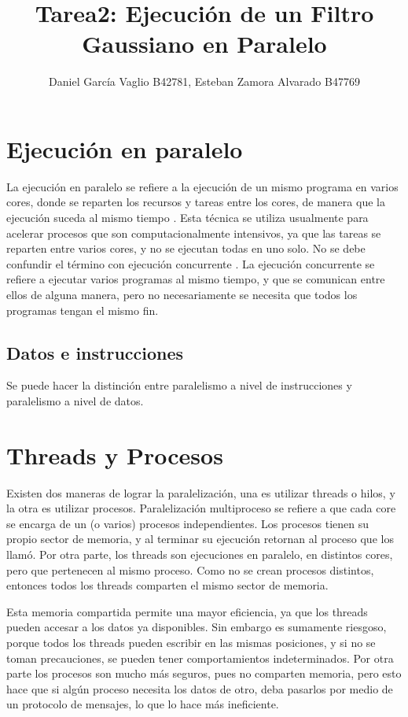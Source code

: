 \documentclass {article}
\begin{document}
\title{Tarea2: Ejecuci\'on de un Filtro Gaussiano en Paralelo}
\author{Daniel García Vaglio B42781, Esteban Zamora Alvarado B47769}

\maketitle

\section{Ejecución en paralelo}

La ejecución en paralelo se refiere a la ejecución de un mismo programa en varios cores, donde
se reparten los recursos y tareas entre los cores, de manera que la ejecución suceda al mismo
tiempo \cite{blaise2017}.
Esta técnica se utiliza  usualmente para acelerar procesos que son computacionalmente intensivos, ya
que las tareas se reparten entre varios cores, y no se ejecutan todas en uno solo. No se debe
confundir el término con ejecución concurrente \cite{grossman2012}.
La ejecución concurrente se refiere a ejecutar varios programas al mismo tiempo, y que se comunican
entre ellos de alguna manera, pero no necesariamente se necesita que todos los programas tengan el
mismo fin.

\subsection{Datos e instrucciones}
Se puede hacer la distinción entre paralelismo a nivel de instrucciones y paralelismo a nivel de
datos.

\section{Threads y Procesos}

Existen dos maneras de lograr la paralelización, una es utilizar threads o hilos, y la otra es
utilizar procesos. Paralelización multiproceso se refiere a que cada core se encarga de un (o varios) procesos
independientes. Los procesos tienen su propio sector de memoria, y al terminar su ejecución retornan
al proceso que los llamó. Por otra parte, los threads son ejecuciones en paralelo, en distintos cores, pero que pertenecen al
mismo proceso. Como no se crean procesos distintos, entonces todos los threads comparten el mismo
sector de memoria. \cite{oracle2015}

Esta memoria compartida permite una mayor eficiencia, ya que los threads pueden
accesar a los datos ya disponibles. Sin embargo es sumamente riesgoso, porque todos los
threads pueden escribir en las mismas posiciones, y si no se toman precauciones, se pueden tener
comportamientos indeterminados. Por otra parte los procesos son mucho más seguros, pues no comparten
memoria, pero esto hace que si algún proceso necesita los datos de otro, deba pasarlos por medio de
un protocolo de mensajes, lo que lo hace más ineficiente.
\end{document}
